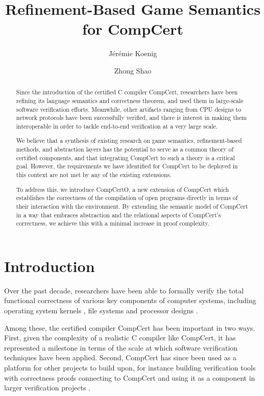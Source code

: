 \documentclass[sigplan,10pt,review,anonymous]{acmart}\settopmatter{printfolios=true,printccs=false,printacmref=false}
\title{Refinement-Based Game Semantics for CompCert}
\author{J\'er\'emie Koenig}
\affiliation{Yale University}
\author{Zhong Shao}
\affiliation{Yale University}
\begin{document}
\begin{abstract} %
Since the introduction of the certified C compiler CompCert,
researchers have been refining
its language semantics and correctness theorem,
and used them in
large-scale software verification efforts.
Meanwhile,
other artifacts ranging from CPU designs to network protocols
have been successfully verified,
and there is interest in
making them interoperable in order to
tackle end-to-end verification
at a very large scale.

We believe that
a synthesis of existing research on
game semantics,
refinement-based methods, and
abstraction layers
has the potential to serve as a common theory
of certified components,
and that integrating CompCert to such a theory
is a critical goal.
However,
the requirements we have identified for
CompCert to be deployed in this context
are not met by any of the existing extensions.

To address this,
we introduce CompCertO,
a new extension of CompCert
which establishes the correctness of the compilation
of open programs directly in terms of their
interaction with the environment.
By extending the semantic model of CompCert
in a way that embraces abstraction and
the relational aspects of CompCert's correctness,
we achieve this with a minimal increase
in proof complexity.
\end{abstract}

\maketitle

\section{Introduction} %


Over the past decade,
researchers have been able to formally verify the
total functional correctness
of various key components of computer systems,
including
operating system kernels \cite{sel4, popl15},
file systems \cite{fscq} and
processor designs \cite{safe}.

Among these,
the certified compiler CompCert \cite{compcert}
has been important in two ways.
First,
given the complexity of a realistic C compiler
like CompCert,
it has represented a milestone
in terms of the scale at which software verification techniques
have been applied.
Second,
CompCert has since been used as a platform for other projects to build upon,
for instance
building verification tools with correctness proofs
connecting to CompCert \cite{vst,verasco} and
using it as a component in larger verification projects \cite{popl15}.
\end{document}
